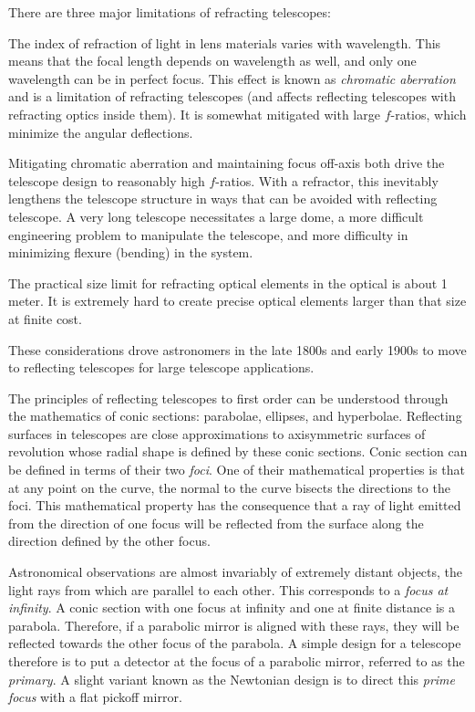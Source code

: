 There are three major limitations of refracting telescopes:
\begin{ditemize}
\item The index of refraction of light in lens materials varies with
wavelength. This means that the focal length depends on wavelength as
well, and only one wavelength can be in perfect focus. This effect is
known as {\it chromatic aberration} and is a limitation of refracting
telescopes (and affects reflecting telescopes with refracting optics
inside them). It is somewhat mitigated with large $f$-ratios, which
minimize the angular deflections.
\item Mitigating chromatic aberration and maintaining focus off-axis
both drive the telescope design to reasonably high $f$-ratios. With a
refractor, this inevitably lengthens the telescope structure in ways
that can be avoided with reflecting telescope. A very long telescope
necessitates a large dome, a more difficult engineering problem to
manipulate the telescope, and more difficulty in minimizing flexure
(bending) in the system.
\item
The practical size limit for refracting optical elements in the
optical is about 1 meter. It is extremely hard to create precise
optical elements larger than that size at finite cost.
\end{ditemize}
These considerations drove astronomers in the late 1800s and early
1900s to move to reflecting telescopes for large telescope
applications.

The principles of reflecting telescopes to first order can be
understood through the mathematics of conic sections: parabolae,
ellipses, and hyperbolae. Reflecting surfaces in telescopes are close
approximations to axisymmetric surfaces of revolution whose radial
shape is defined by these conic sections. Conic section can be defined
in terms of their two {\it foci}. One of their mathematical properties
is that at any point on the curve, the normal to the curve bisects the
directions to the foci. This mathematical property has the consequence
that a ray of light emitted from the direction of one focus will be
reflected from the surface along the direction defined by the other
focus.

Astronomical observations are almost invariably of extremely distant
objects, the light rays from which are parallel to each other. This
corresponds to a {\it focus at infinity}. A conic section with one
focus at infinity and one at finite distance is a parabola. Therefore,
if a parabolic mirror is aligned with these rays, they will be
reflected towards the other focus of the parabola. A simple design for
a telescope therefore is to put a detector at the focus of a parabolic
mirror, referred to as the {\it primary}. A slight variant known as
the Newtonian design is to direct this {\it prime focus} with a flat
pickoff mirror.

